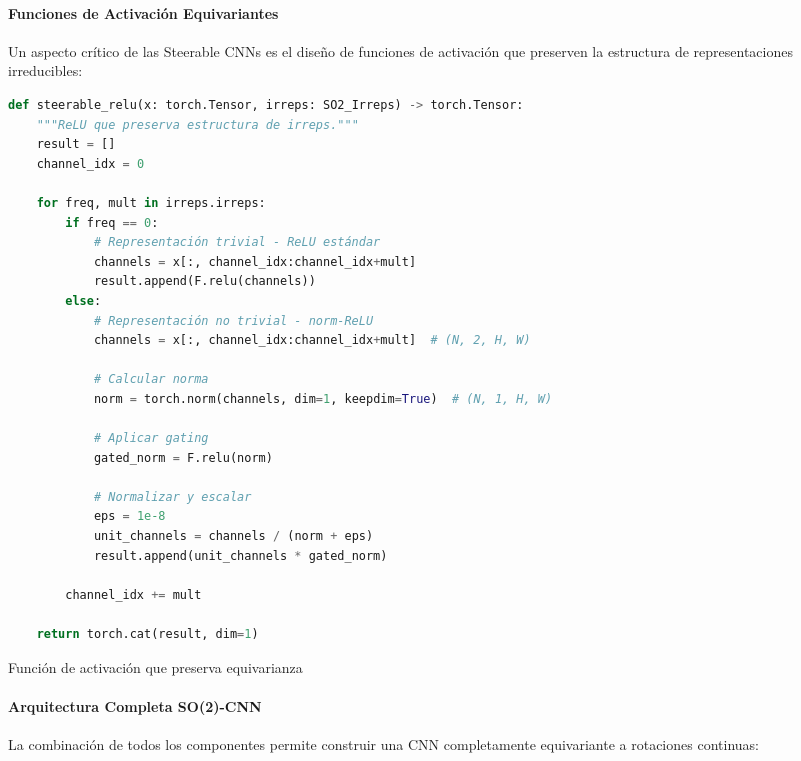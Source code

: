 \paragraph{Funciones de Activación Equivariantes}

Un aspecto crítico de las Steerable CNNs es el diseño de funciones de activación que preserven la estructura de representaciones irreducibles:

\begin{listing}[h]
\begin{lstlisting}[language=Python]
def steerable_relu(x: torch.Tensor, irreps: SO2_Irreps) -> torch.Tensor:
    """ReLU que preserva estructura de irreps."""
    result = []
    channel_idx = 0
    
    for freq, mult in irreps.irreps:
        if freq == 0:
            # Representación trivial - ReLU estándar
            channels = x[:, channel_idx:channel_idx+mult]
            result.append(F.relu(channels))
        else:
            # Representación no trivial - norm-ReLU
            channels = x[:, channel_idx:channel_idx+mult]  # (N, 2, H, W)
            
            # Calcular norma
            norm = torch.norm(channels, dim=1, keepdim=True)  # (N, 1, H, W)
            
            # Aplicar gating
            gated_norm = F.relu(norm)
            
            # Normalizar y escalar
            eps = 1e-8
            unit_channels = channels / (norm + eps)
            result.append(unit_channels * gated_norm)
        
        channel_idx += mult
    
    return torch.cat(result, dim=1)
\end{lstlisting}
\caption{Función de activación que preserva equivarianza}
\label{code:steerable_relu}
\end{listing}

\paragraph{Arquitectura Completa SO(2)-CNN}

La combinación de todos los componentes permite construir una CNN completamente equivariante a rotaciones continuas:

